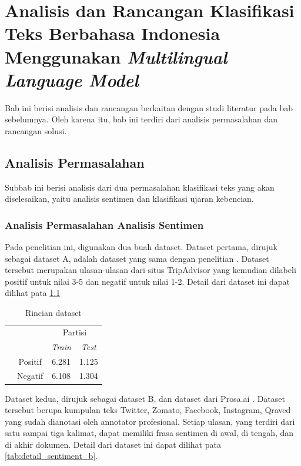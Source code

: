 \chapter{Analisis dan Rancangan Klasifikasi Teks Berbahasa Indonesia Menggunakan \textit{Multilingual Language Model}}

Bab ini berisi analisis dan rancangan berkaitan dengan studi literatur pada bab sebelumnya. Oleh karena itu, bab ini terdiri dari analisis permasalahan dan rancangan solusi.

\section{Analisis Permasalahan}
	Subbab ini berisi analisis dari dua permasalahan klasifikasi teks yang akan diselesaikan, yaitu analisis sentimen dan klasifikasi ujaran kebencian.

	\subsection{Analisis Permasalahan Analisis Sentimen}
	Pada penelitian ini, digunakan dua buah dataset. Dataset pertama, dirujuk sebagai dataset A, adalah dataset yang sama dengan penelitian \parencite{FarhanKhodra2017}. Dataset tersebut merupakan ulasan-ulasan dari situs TripAdvisor yang kemudian dilabeli positif untuk nilai 3-5 dan negatif untuk nilai 1-2. Detail dari dataset ini dapat dilihat pata \ref{tab:detail_sentiment_a}

	\begin{table}[ht]
	    \centering
	    \caption{Rincian dataset \parencite{FarhanKhodra2017}}
	    \begin{tabular}{@{}cc|cc@{}}
			\multicolumn{1}{c}{} &\multicolumn{1}{c}{} &\multicolumn{2}{c}{Partisi} \\ 
			\multicolumn{1}{c}{} & 
			\multicolumn{1}{c|}{} & 
			\multicolumn{1}{c}{\textit{Train}} & 
			\multicolumn{1}{c}{\textit{Test}} \\ 
			\cline{2-4}
			\multirow[c]{2}{*}{\rotatebox[origin=tr]{90}{Label}}
			& Positif  & 6.281 & 1.125   \\[1.5ex]
			& Negatif  & 6.108 & 1.304   \\ 
			\cline{2-4}
	    \end{tabular}
	    \label{tab:detail_sentiment_a}
	\end{table}
	
	Dataset kedua, dirujuk sebagai dataset B,  dan dataset dari Prosa.ai \parencite{CrisdayantiPurwarianti2019}. Dataset tersebut berupa kumpulan teks Twitter, Zomato, Facebook, Instagram, Qraved yang sudah dianotasi oleh annotator profesional. Setiap ulasan, yang terdiri dari satu sampai tiga kalimat, dapat memiliki frasa sentimen di awal, di tengah, dan di akhir dokumen. Detail dari dataset ini dapat dilihat pata \ref{tab:detail_sentiment_b}.

